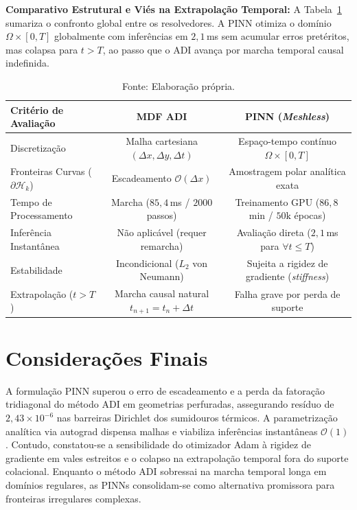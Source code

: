 \documentclass[a4paper, 12pt, twoside]{article}
\begin{document}
\textbf{Comparativo Estrutural e Viés na Extrapolação Temporal:} A Tabela~\ref{tab:adi_vs_pinn} sumariza o confronto global entre os resolvedores. A PINN otimiza o domínio $\Omega \times [0, T]$ globalmente com inferências em $2{,}1$\,ms sem acumular erros pretéritos, mas colapsa para $t > T$, ao passo que o ADI \parencite{pereira2019} avança por marcha temporal causal indefinida.

\begin{table}[!ht]
\centering
\caption{Síntese comparativa: Método ADI \parencite{pereira2019} versus PINN contínua.}
\label{tab:adi_vs_pinn}
\footnotesize
\setlength{\tabcolsep}{2.5pt}
\begin{tabular}{lcc}
\toprule
\textbf{Critério de Avaliação} & \textbf{MDF ADI \parencite{pereira2019}} & \textbf{PINN (\textit{Meshless})} \\
\midrule
Discretização & Malha cartesiana $(\Delta x, \Delta y, \Delta t)$ & Espaço-tempo contínuo $\Omega \times [0, T]$ \\
Fronteiras Curvas ($\partial\mathcal{H}_k$) & Escadeamento $\mathcal{O}(\Delta x)$ & Amostragem polar analítica exata \\
Tempo de Processamento & Marcha ($85{,}4$\,ms / $2000$ passos) & Treinamento GPU ($86{,}8$\,min / $50\text{k}$ épocas) \\
Inferência Instantânea & Não aplicável (requer remarcha) & Avaliação direta ($2{,}1$\,ms para $\forall t \le T$) \\
Estabilidade & Incondicional ($L_2$ von Neumann) & Sujeita a rigidez de gradiente (\textit{stiffness}) \\
Extrapolação ($t > T$) & Marcha causal natural $t_{n+1} = t_n + \Delta t$ & Falha grave por perda de suporte \\
\bottomrule
\end{tabular}
\caption*{Fonte: Elaboração própria.}
\end{table}

\section{Considerações Finais}

A formulação PINN superou o erro de escadeamento e a perda da fatoração tridiagonal do método ADI em geometrias perfuradas, assegurando resíduo de $2{,}43 \times 10^{-6}$ nas barreiras Dirichlet dos sumidouros térmicos. A parametrização analítica via autograd dispensa malhas e viabiliza inferências instantâneas $\mathcal{O}(1)$. Contudo, constatou-se a sensibilidade do otimizador Adam à rigidez de gradiente em vales estreitos e o colapso na extrapolação temporal fora do suporte colacional. Enquanto o método ADI \parencite{pereira2019} sobressai na marcha temporal longa em domínios regulares, as PINNs consolidam-se como alternativa promissora para fronteiras irregulares complexas.

\renewcommand*{\bibfont}{\small}
\setlength{\bibitemsep}{2pt}
\begin{refcontext}[sorting=none]
\printbibliography
\end{refcontext}
\end{document}
